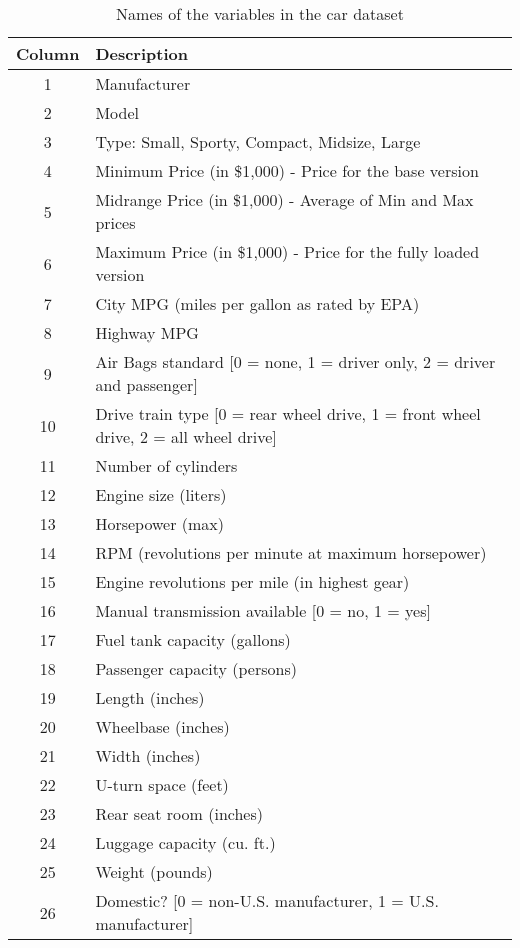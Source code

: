 \begin{table}[hp!]
\caption{Names of the variables in the car dataset} \label{DataDescript}
\vspace{1em}
\begin{tabular}{cl} \hline
Column & Description \\ \hline
1 & Manufacturer \\
2 & Model \\
3 & Type: Small, Sporty, Compact, Midsize, Large \\
4 & Minimum Price (in \$1,000) - Price for the base version \\
5 & Midrange Price (in \$1,000) - Average of Min and Max prices \\
6 & Maximum Price (in \$1,000) - Price for the fully loaded version \\
7 & City MPG (miles per gallon as rated by EPA) \\
8 & Highway MPG \\
9 & Air Bags standard [0 = none, 1 = driver only, 2 = driver and passenger] \\
10 & Drive train type [0 = rear wheel drive, 1 = front wheel drive, 2 = all wheel drive] \\
11 & Number of cylinders \\
12 & Engine size (liters) \\
13 & Horsepower (max) \\
14 & RPM (revolutions per minute at maximum horsepower) \\
15 & Engine revolutions per mile (in highest gear) \\
16 & Manual transmission available [0 = no, 1 = yes] \\
17 &Fuel tank capacity (gallons) \\
18 &Passenger capacity (persons) \\
19 & Length (inches) \\
20 & Wheelbase (inches) \\
21 & Width (inches) \\
22 & U-turn space (feet) \\
23 & Rear seat room (inches) \\
24 & Luggage capacity (cu. ft.) \\
25 & Weight (pounds) \\
26 & Domestic? [0 = non-U.S. manufacturer, 1 = U.S. manufacturer] \\\hline
\end{tabular}
\end{table}
